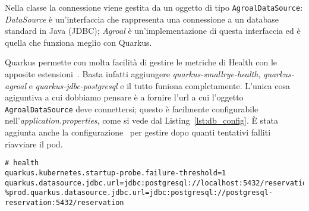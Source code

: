 \myskip

Nella classe la connessione viene gestita da un oggetto di tipo \texttt{AgroalDataSource}\cite{quarkus_datasource}: \textit{DataSource} è un'interfaccia che rappresenta una connessione a un database standard in Java (JDBC); \textit{Agroal} è un'implementazione di questa interfaccia ed è quella che funziona meglio con Quarkus.

Quarkus permette con molta facilità di gestire le metriche di Health con le apposite estensioni~\cite{quarkus_health}. Basta infatti aggiungere \textit{quarkus-smallrye-health}, \textit{quarkus-agroal} e \textit{quarkus-jdbc-postgresql} e il tutto funiona completamente. L'unica cosa agiguntiva a cui dobbiamo pensare è a fornire l'url a cui l'oggetto \texttt{AgroalDataSource} deve connettersi; questo è facilmente configurabile nell'\textit{application.properties}, come si vede dal Listing~\ref{lst:db_config}. È stata aggiunta anche la configurazione~\cite{quarkus_all_config} per gestire dopo quanti tentativi falliti riavviare il pod.
\begin{lstlisting}[caption=JDBC configuration., label=lst:db_config]
# health
quarkus.kubernetes.startup-probe.failure-threshold=1
quarkus.datasource.jdbc.url=jdbc:postgresql://localhost:5432/reservation
%prod.quarkus.datasource.jdbc.url=jdbc:postgresql://postgresql-reservation:5432/reservation
\end{lstlisting}